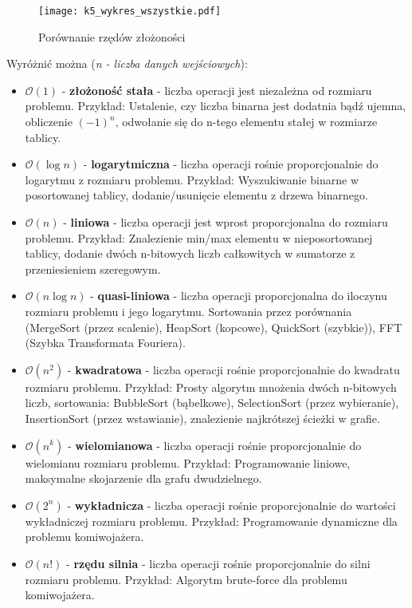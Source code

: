 \begin{figure}[H]
	\centering
	\texttt{[image: k5\_wykres\_wszystkie.pdf]}
	\caption{Porównanie rzędów złożoności}
\end{figure}

Wyróżnić można (\textit{n - liczba danych wejściowych}):
\begin{itemize}
	\setlength\itemsep{1pt}
	\item $\mathcal{O}(1)$ - \textbf{złożoność stała} -  liczba operacji jest niezależna od rozmiaru problemu. Przykład: Ustalenie, czy liczba binarna jest dodatnia bądź ujemna, obliczenie $(-1)^n$, odwołanie się do n-tego elementu stałej w rozmiarze tablicy.
	\item $\mathcal{O}(\log n)$ - \textbf{logarytmiczna} - liczba operacji rośnie proporcjonalnie do logarytmu z rozmiaru problemu. Przykład: Wyszukiwanie binarne w posortowanej tablicy, dodanie/usunięcie elementu z drzewa binarnego.
	\item $\mathcal{O}(n)$ - \textbf{liniowa} - liczba operacji jest wprost proporcjonalna do rozmiaru problemu. Przykład: Znalezienie min/max elementu w nieposortowanej tablicy, dodanie dwóch n-bitowych liczb całkowitych w sumatorze z przeniesieniem szeregowym.
	\item $\mathcal{O}(n\log n)$ - \textbf{quasi-liniowa} - liczba operacji proporcjonalna do iloczynu rozmiaru problemu i jego logarytmu. Sortowania przez porównania (MergeSort (przez scalenie), HeapSort (kopcowe), QuickSort (szybkie)), FFT (Szybka Transformata Fouriera).
	\item $\mathcal{O}(n^2)$ - \textbf{kwadratowa} - liczba operacji rośnie proporcjonalnie do kwadratu rozmiaru problemu. Przykład: Prosty algorytm mnożenia dwóch n-bitowych liczb, sortowania: BubbleSort (bąbelkowe), SelectionSort (przez wybieranie), InsertionSort (przez wstawianie), znalezienie najkrótszej ścieżki w grafie.
	\item $\mathcal{O}(n^k)$ - \textbf{wielomianowa} - liczba operacji rośnie proporcjonalnie do wielomianu rozmiaru problemu. Przykład: Programowanie liniowe, maksymalne skojarzenie dla grafu dwudzielnego.
	\item $\mathcal{O}(2^n)$ - \textbf{wykładnicza} - liczba operacji rośnie proporcjonalnie do wartości wykładniczej rozmiaru problemu. Przykład: Programowanie dynamiczne dla problemu komiwojażera.
	\item $\mathcal{O}(n!)$ - \textbf{rzędu silnia} - liczba operacji rośnie proporcjonalnie do silni rozmiaru problemu. Przykład: Algorytm brute-force dla problemu komiwojażera.
\end{itemize}